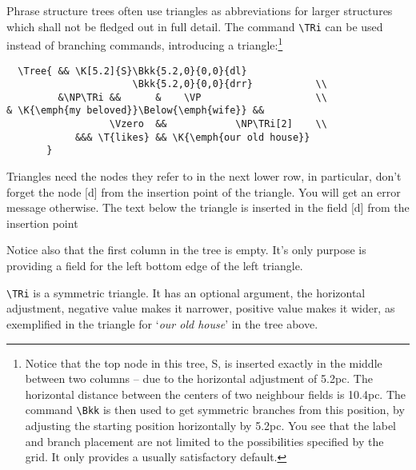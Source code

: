 \documentclass[12pt,a4paper]{article}
\begin{document}
Phrase structure trees often use triangles as abbreviations for larger
structures which shall not be fledged out in full detail. The command
\verb|\TRi| can be used instead of branching commands, introducing a
triangle:\footnote{Notice that the top node in this tree, S, is inserted exactly
  in the middle between two columns -- due to the horizontal adjustment of
  5.2pc. The horizontal distance between the centers of two neighbour fields is
  10.4pc. The command \texttt{\textbackslash Bkk} is then used to get symmetric
  branches from this position, by adjusting the starting position horizontally
  by 5.2pc. You see that the label and branch placement are not limited to the
  possibilities specified by the grid. It only provides a usually satisfactory
  default.}

\begin{center}
\end{center}

\begin{verbatim}
  \Tree{ && \K[5.2]{S}\Bkk{5.2,0}{0,0}{dl}
                      \Bkk{5.2,0}{0,0}{drr}           \\
         &\NP\TRi &&      &    \VP                    \\
& \K{\emph{my beloved}}\Below{\emph{wife}} &&
                  \Vzero  &&            \NP\TRi[2]    \\
            &&& \T{likes} && \K{\emph{our old house}}
       }
\end{verbatim}

Triangles need the nodes they refer to in the next lower row, in particular,
don't forget the node [d] from the insertion point of the triangle. You will
get an error message otherwise. The text below the triangle is inserted in the
field [d] from the insertion point

Notice also that the first column in the tree is empty. It's only purpose is
providing a field for the left bottom edge of the left triangle.

\verb|\TRi| is a symmetric triangle. It has an optional argument, the horizontal
adjustment, negative value makes it narrower, positive value makes it wider, as
exemplified in the triangle for `\emph{our old house}' in the tree above.
\end{document}

